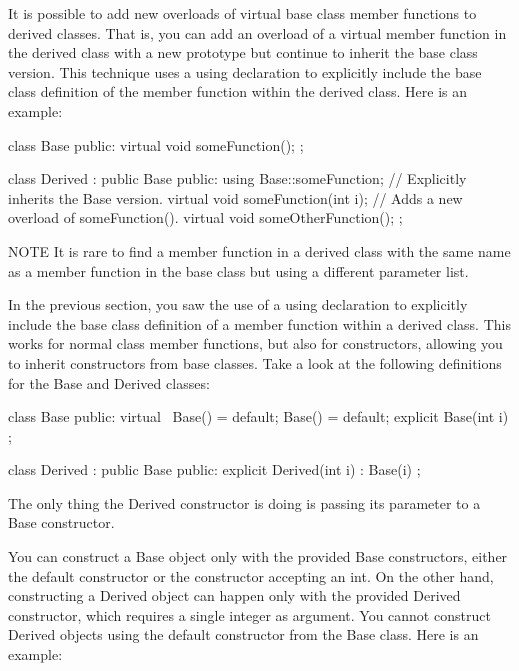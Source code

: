 
It is possible to add new overloads of virtual base class member functions to derived classes. That is, you can add an overload of a virtual member function in the derived class with a new prototype but continue to inherit the base class version. This technique uses a using declaration to explicitly include the base class definition of the member function within the derived class. Here is an example:

\begin{cpp}
class Base
{
    public:
        virtual void someFunction();
};

class Derived : public Base
{
    public:
        using Base::someFunction; // Explicitly inherits the Base version.
        virtual void someFunction(int i); // Adds a new overload of someFunction().
        virtual void someOtherFunction();
};
\end{cpp}

\begin{myNotic}{NOTE}
It is rare to find a member function in a derived class with the same name as a member function in the base class but using a different parameter list.
\end{myNotic}


In the previous section, you saw the use of a using declaration to explicitly include the base class definition of a member function within a derived class. This works for normal class member functions, but also for constructors, allowing you to inherit constructors from base classes. Take a look at the following definitions for the Base and Derived classes:

\begin{cpp}
class Base
{
    public:
        virtual ~Base() = default;
        Base() = default;
        explicit Base(int i) {}
};

class Derived : public Base
{
    public:
        explicit Derived(int i) : Base(i) {}
};
\end{cpp}

The only thing the Derived constructor is doing is passing its parameter to a Base constructor.

You can construct a Base object only with the provided Base constructors, either the default constructor or the constructor accepting an int. On the other hand, constructing a Derived object can happen only with the provided Derived constructor, which requires a single integer as argument. You cannot construct Derived objects using the default constructor from the Base class. Here is an example:


